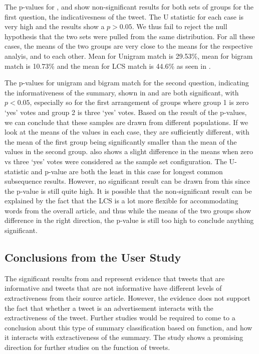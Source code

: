 The p-values for ,  and  show non-significant results for both sets of groups for the first question, the indicativesness of the tweet. The U statistic for each case is very high and the results show a $p>0.05$. We thus fail to reject the null hypothesis that the two sets were pulled from the same distribution. For all these cases, the means of the two groups are very close to the means for the respective analyis, and to each other. Mean for Unigram match is 29.53\%, mean for bigram match is 10.73\% and the mean for LCS match is 44.6\% as seen in . 

The p-values for unigram and bigram match for the second question, indicating the informativeness of the summary, shown in  and  are both significant, with $p<0.05$, especially so for the first arrangement of groups where group 1 is zero `yes' votes and group 2 is three `yes' votes. Based on the result of the p-values, we can conclude that these samples are drawn from different populations. If we look at the means of the values in each case, they are sufficiently different, with the mean of the first group being significantly smaller than the mean of the values in the second group.  also shows a slight difference in the means when zero vs three `yes' votes were considered as the sample set configuration. The U-statistic and p-value are both the least in this case for longest common subsequence results. However, no significant result can be drawn from this since the p-value is still quite high. It is possible that the non-significant result can be explained by the fact that the LCS is a lot more flexible for accommodating words from the overall article, and thus while the means of the two groups show difference in the right direction, the p-value is still too	 high to conclude anything significant. 

\subsection{Conclusions from the User Study}

The significant results from  and  represent evidence that tweets that are informative and tweets that are not informative have different levels of extractiveness from their source article. However, the evidence does not support the fact that whether a tweet is an advertisement interacts with the extractiveness of the tweet. Further studies would be required to come to a conclusion about this type of summary classification based on function, and how it interacts with extractiveness of the summary. The study shows a promising direction for further studies on the function of tweets. 

